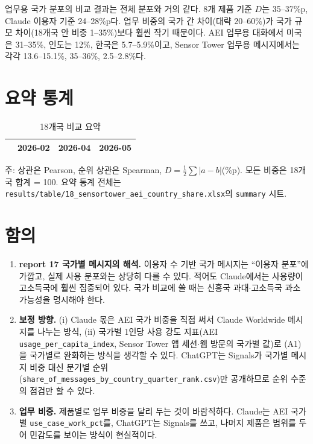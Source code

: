 \documentclass[11pt]{article}
\begin{document}
업무용 국가 분포의 비교 결과는 전체 분포와 거의 같다. 8개 제품 기준 $D$는 35--37\%p, Claude 이용자 기준 24--28\%p다. 업무 비중의 국가 간 차이(대략 20--60\%)가 국가 규모 차이(18개국 안 비중 1--35\%)보다 훨씬 작기 때문이다. AEI 업무용 대화에서 미국은 31--35\%, 인도는 12\%, 한국은 5.7--5.9\%이고, Sensor Tower 업무용 메시지에서는 각각 13.6--15.1\%, 35--36\%, 2.5--2.8\%다.

\section{요약 통계}

\begin{table}[htbp]
\centering
\caption{18개국 비교 요약}\label{tab:summary}
\begin{tabular}{lrrr}
\toprule
 & 2026-02 & 2026-04 & 2026-05 \\
\midrule

\bottomrule
\end{tabular}
\par\smallskip\footnotesize 주: 상관은 Pearson, 순위 상관은 Spearman, $D = \tfrac12\sum|a-b|$(\%p). 모든 비중은 18개국 합계 = 100. 요약 통계 전체는 \texttt{results/table/18\_sensortower\_aei\_country\_share.xlsx}의 \texttt{summary} 시트.
\end{table}

\section{함의}

\begin{enumerate}[leftmargin=*]
  \item \textbf{report 17 국가별 메시지의 해석.} 이용자 수 기반 국가 메시지는 ``이용자 분포''에 가깝고, 실제 사용 분포와는 상당히 다를 수 있다. 적어도 Claude에서는 사용량이 고소득국에 훨씬 집중되어 있다. 국가 비교에 쓸 때는 신흥국 과대$\cdot$고소득국 과소 가능성을 명시해야 한다.
  \item \textbf{보정 방향.} (i) Claude 몫은 AEI 국가 비중을 직접 써서 Claude Worldwide 메시지를 나누는 방식, (ii) 국가별 1인당 사용 강도 지표(AEI \texttt{usage\_per\_capita\_index}, Sensor Tower 앱 세션$\cdot$웹 방문의 국가별 값)로 (A1)을 국가별로 완화하는 방식을 생각할 수 있다. ChatGPT는 Signals가 국가별 메시지 비중 대신 분기별 순위(\texttt{share\_of\_messages\_by\_country\_quarter\_rank.csv})만 공개하므로 순위 수준의 점검만 할 수 있다.
  \item \textbf{업무 비중.} 제품별로 업무 비중을 달리 두는 것이 바람직하다. Claude는 AEI 국가별 \texttt{use\_case\_work\_pct}를, ChatGPT는 Signals를 쓰고, 나머지 제품은 범위를 두어 민감도를 보이는 방식이 현실적이다.
\end{enumerate}
\end{document}
